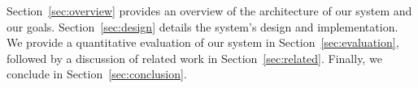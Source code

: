 
%
Section~\ref{sec:overview} provides an overview of the architecture of our
system and our goals. Section~\ref{sec:design} details the system's
design and implementation.
We provide a quantitative evaluation of our system
in Section~\ref{sec:evaluation}, followed by a discussion of related
work in Section~\ref{sec:related}.  Finally,
we conclude in Section~\ref{sec:conclusion}.

